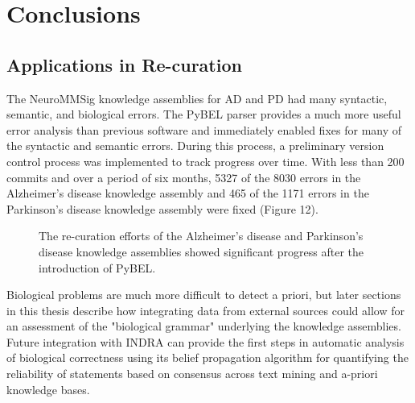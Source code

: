 \section{Conclusions}

\subsection{Applications in Re-curation}
The \ac{NeuroMMSig} knowledge assemblies for \ac{AD} and \ac{PD} had many syntactic, semantic, and biological errors. The PyBEL parser provides a much more useful error analysis than previous software and immediately enabled fixes for many of the syntactic and semantic errors. During this process, a preliminary version control process was implemented to track progress over time. With less than 200 commits and over a period of six months, 5327 of the 8030 errors in the Alzheimer's disease knowledge assembly and 465 of the 1171 errors in the Parkinson's disease knowledge assembly were fixed (Figure 12).

\begin{figure}
\captionsetup{format=plain}
\caption[NeuroMMSig Recuration Summary]{The re-curation efforts of the Alzheimer's disease and Parkinson's disease knowledge assemblies showed significant progress after the introduction of PyBEL.}
\label{Fig:recuration_summary}
\end{figure}

Biological problems are much more difficult to detect a priori, but later sections in this thesis describe how integrating data from external sources could allow for an assessment of the "biological grammar" underlying the knowledge assemblies. Future integration with \ac{INDRA} can provide the first steps in automatic analysis of biological correctness using its belief propagation algorithm for quantifying the reliability of statements  based on consensus across text mining and a-priori knowledge bases.

